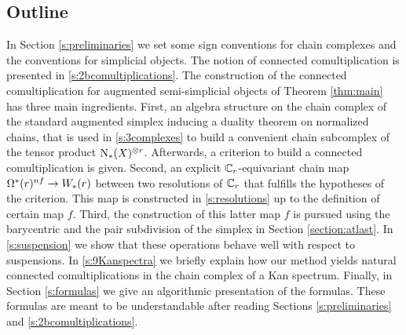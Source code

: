 \subsection{Outline} In Section \ref{s:preliminaries} we set some sign conventions for chain complexes and the conventions for simplicial objects. The notion of connected comultiplication is presented in \cref{s:2bcomultiplications}. The construction of the connected comultiplication for augmented semi-simplicial objects of Theorem \ref{thm:main} has three main ingredients.
First, an algebra structure on the chain complex of the standard augmented simplex inducing a duality theorem on normalized chains, that is used in \cref{s:3complexes} to build a convenient chain subcomplex of the tensor product $\operatorname{N}_{*}(X)^{\otimes r}$. Afterwards, a criterion to build a connected comultiplication is given.
Second, an explicit $\mathbb{C}_r$-equivariant chain map $\Omega^*(r)^{nf}\to W_*(r)$ between two resolutions of $\mathbb{C}_r$ that fulfills the hypotheses of the criterion. This map is constructed in \cref{s:resolutions} up to the definition of certain map $f$. Third, the construction of this latter map $f$ is pursued using the barycentric and the pair subdivision of the simplex in Section \ref{section:atlast}. In \cref{s:suspension} we show that these operations behave well with respect to suspensions. In \cref{s:9Kanspectra} we briefly explain how our method yields natural connected comultiplications in the chain complex of a Kan spectrum. Finally, in Section \ref{s:formulas} we give an algorithmic presentation of the formulas. These formulas are meant to be understandable after reading Sections \ref{s:preliminaries} and \ref{s:2bcomultiplications}.
